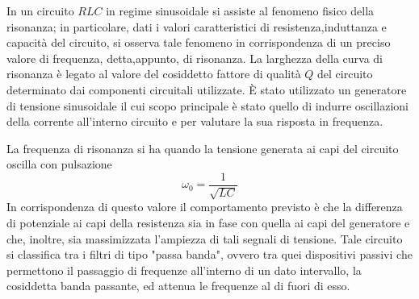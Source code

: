 In un circuito $RLC$ in regime sinusoidale si assiste al fenomeno fisico della risonanza; in particolare, dati i valori
caratteristici di resistenza,induttanza e capacità del circuito, si osserva tale fenomeno in corrispondenza di un preciso
valore di frequenza, detta,appunto, di risonanza. La larghezza della curva di risonanza è legato al valore del cosiddetto
fattore di qualità $Q$ del circuito determinato dai componenti circuitali utilizzate.
È stato utilizzato un generatore di tensione sinusoidale il cui scopo principale è stato quello di indurre oscillazioni
della corrente all'interno circuito e per valutare la sua risposta in frequenza.

La frequenza di risonanza si ha quando la tensione generata ai capi del circuito oscilla con pulsazione
\begin{equation}\label{eq:res-pulsation}
    \omega_0 = \frac{1}{\sqrt{L C}}
\end{equation}
In corrispondenza di questo valore il comportamento previsto è che la differenza di potenziale ai capi della
resistenza sia in fase con quella ai capi del generatore e che, inoltre, sia massimizzata l'ampiezza di tali segnali
di tensione.
Tale circuito si classifica tra i filtri di tipo "passa banda", ovvero tra quei dispositivi passivi che permettono il
passaggio di frequenze all'interno di un dato intervallo, la cosiddetta banda passante, ed attenua le frequenze al
di fuori di esso.
%
